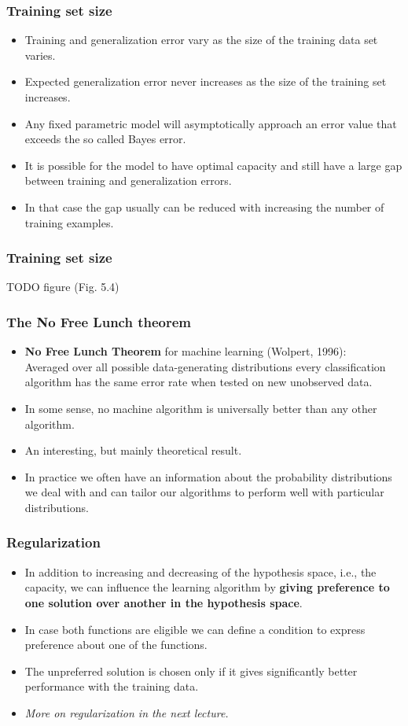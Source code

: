 \documentclass[notes]{beamer}          %
\begin{document}
\begin{frame}
\frametitle{Training set size}
    \begin{itemize}
        \item Training and generalization error vary as the size of the training data set varies.
        \item Expected generalization error never increases as the size of the training set increases.
        \item Any fixed parametric model will asymptotically approach an error value that exceeds the so called Bayes error.
        \item It is possible for the model to have optimal capacity and still have a large gap between training and generalization errors.
        \item In that case the gap usually can be reduced with increasing the number of training examples.
    \end{itemize}
\end{frame}


\begin{frame}
\frametitle{Training set size}
    TODO figure (Fig. 5.4)
\end{frame}


\begin{frame}
\frametitle{The No Free Lunch theorem}
    \begin{itemize}
        \item {\bf No Free Lunch Theorem} for machine learning (Wolpert, 1996): \\
        Averaged over all possible data-generating distributions every classification algorithm has the same error rate when tested on new unobserved data.
        \item In some sense, no machine algorithm is universally better than any other algorithm.
        \item An interesting, but mainly theoretical result.
        \item In practice we often have an information about the probability distributions we deal with and can tailor our algorithms to perform well with particular distributions.
    \end{itemize}

\end{frame}

\begin{frame}
\frametitle{Regularization}
    \begin{itemize}
        \item In addition to increasing and decreasing of the hypothesis space, i.e., the capacity, we can influence the learning algorithm by \textbf{giving preference to one solution over another in the hypothesis space}.
        \item In case both functions are eligible we can define a condition to express preference about one of the functions.
        \item The unpreferred solution is chosen only if it gives significantly better performance with the training data.
        \item \textit{More on regularization in the next lecture.}
    \end{itemize}
\end{frame}
\end{document}
